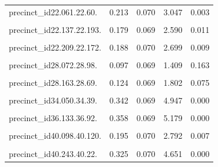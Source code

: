 \documentclass[
  letterpaper,
  DIV=11,
  numbers=noendperiod]{scrartcl}
\begin{document}
\begin{table}[!h]
\begin{threeparttable}
\begin{tabular}{lrrrr}
precinct\_id22.061.22.60. & 0.213 & 0.070 & 3.047 & 0.003\\
\addlinespace
\cellcolor{gray!10}{precinct\_id22.124.22.52.} & \cellcolor{gray!10}{0.156} & \cellcolor{gray!10}{0.070} & \cellcolor{gray!10}{2.230} & \cellcolor{gray!10}{0.029}\\
precinct\_id22.137.22.193. & 0.179 & 0.069 & 2.590 & 0.011\\
\cellcolor{gray!10}{precinct\_id22.158.22.203.} & \cellcolor{gray!10}{0.165} & \cellcolor{gray!10}{0.070} & \cellcolor{gray!10}{2.357} & \cellcolor{gray!10}{0.021}\\
precinct\_id22.209.22.172. & 0.188 & 0.070 & 2.699 & 0.009\\
\cellcolor{gray!10}{precinct\_id28.056.28.149.} & \cellcolor{gray!10}{-0.011} & \cellcolor{gray!10}{0.070} & \cellcolor{gray!10}{-0.160} & \cellcolor{gray!10}{0.873}\\
\addlinespace
precinct\_id28.072.28.98. & 0.097 & 0.069 & 1.409 & 0.163\\
\cellcolor{gray!10}{precinct\_id28.139.28.145.} & \cellcolor{gray!10}{0.040} & \cellcolor{gray!10}{0.072} & \cellcolor{gray!10}{0.553} & \cellcolor{gray!10}{0.582}\\
precinct\_id28.163.28.69. & 0.124 & 0.069 & 1.802 & 0.075\\
\cellcolor{gray!10}{precinct\_id29.241.29.172.} & \cellcolor{gray!10}{0.067} & \cellcolor{gray!10}{0.070} & \cellcolor{gray!10}{0.958} & \cellcolor{gray!10}{0.341}\\
precinct\_id34.050.34.39. & 0.342 & 0.069 & 4.947 & 0.000\\
\addlinespace
\cellcolor{gray!10}{precinct\_id34.151.34.125.} & \cellcolor{gray!10}{0.098} & \cellcolor{gray!10}{0.070} & \cellcolor{gray!10}{1.399} & \cellcolor{gray!10}{0.166}\\
precinct\_id36.133.36.92. & 0.358 & 0.069 & 5.179 & 0.000\\
\cellcolor{gray!10}{precinct\_id40.044.40.68.} & \cellcolor{gray!10}{0.236} & \cellcolor{gray!10}{0.072} & \cellcolor{gray!10}{3.275} & \cellcolor{gray!10}{0.002}\\
precinct\_id40.098.40.120. & 0.195 & 0.070 & 2.792 & 0.007\\
\cellcolor{gray!10}{precinct\_id40.134.40.174.} & \cellcolor{gray!10}{0.216} & \cellcolor{gray!10}{0.069} & \cellcolor{gray!10}{3.127} & \cellcolor{gray!10}{0.002}\\
\addlinespace
precinct\_id40.243.40.22. & 0.325 & 0.070 & 4.651 & 0.000\\

\end{tabular}
\end{threeparttable}
\end{table}
\end{document}
